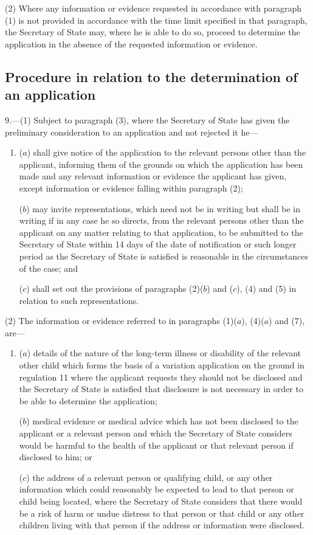 \documentclass[12pt,a4paper]{article}
\begin{document}
(2) Where any information or evidence requested in accordance with paragraph (1) is not provided in accordance with the time limit specified in that paragraph, the Secretary of State may, where he is able to do so, proceed to determine the application in the absence of the requested information or evidence.

\subsection[9. Procedure in relation to the determination of an application]{Procedure in relation to the determination of an application}

9.---(1)  Subject to paragraph (3), where the Secretary of State has given the preliminary consideration to an application and not rejected it he—
\begin{enumerate}\item[]
($a$) shall give notice of the application to the relevant persons other than the applicant, informing them of the grounds on which the application has been made and any relevant information or evidence the applicant has given, except information or evidence falling within paragraph (2);

($b$) may invite representations, which need not be in writing but shall be in writing if in any case he so directs, from the relevant persons other than the applicant on any matter relating to that application, to be submitted to the Secretary of State within 14 days of the date of notification or such longer period as the Secretary of State is satisfied is reasonable in the circumstances of the case; and

($c$) shall set out the provisions of paragraphs (2)($b$)  and ($c$), (4) and (5) in relation to such representations.
\end{enumerate}

(2) The information or evidence referred to in paragraphs (1)($a$), (4)($a$)  and (7), are—
\begin{enumerate}\item[]
($a$) details of the nature of the long-term illness or disability of the relevant other child which forms the basis of a variation application on the ground in regulation 11 where the applicant requests they should not be disclosed and the Secretary of State is satisfied that disclosure is not necessary in order to be able to determine the application;

($b$) medical evidence or medical advice which has not been disclosed to the applicant or a relevant person and which the Secretary of State considers would be harmful to the health of the applicant or that relevant person if disclosed to him; or

($c$) the address of a relevant person or qualifying child, or any other information which could reasonably be expected to lead to that person or child being located, where the Secretary of State considers that there would be a risk of harm or undue distress to that person or that child or any other children living with that person if the address or information were disclosed.
\end{enumerate}
\end{document}
